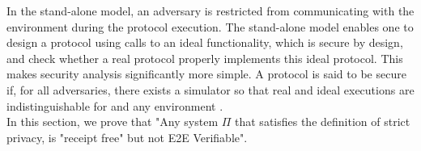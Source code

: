 In the stand-alone model, an adversary is restricted from communicating with the environment during the protocol execution. The stand-alone model enables one to design a protocol using calls to an ideal functionality, which is secure by design,  and check whether a real protocol properly implements this ideal protocol. This makes security analysis significantly more simple. A protocol is said to be secure if, for all adversaries, there exists a simulator so that real and ideal executions are indistinguishable for and any environment \cite{Lindell2016}. \\

In this section, we prove that "Any system $\Pi$ that satisfies the definition of strict privacy, is "receipt free" but not E2E Verifiable".\\

